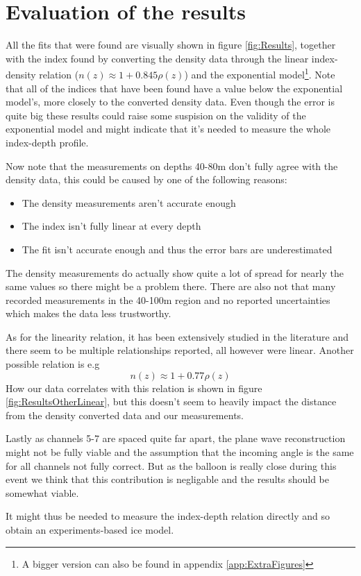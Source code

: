 \section{Evaluation of the results}
All the fits that were found are visually shown in figure \ref{fig:Results},  together
with the index found by converting the density data through the linear index-density relation
($n(z) \approx 1 + 0.845\rho(z)$) and the exponential model\footnote{A bigger version can also be found in appendix \ref{app:ExtraFigures}}.
Note that all of the indices that have been found have a value below the
exponential model's, more closely to the converted density data.
Even though the error is quite big these results could raise some
suspision on the validity of the exponential model and might indicate
that it's needed to measure the whole index-depth profile.

Now note that the measurements on depths 40-80m don't fully agree with the density data, 
this could be caused by one of the following reasons:
\begin{itemize}
	\item The density measurements aren't accurate enough
	\item The index isn't fully linear at every depth
	\item The fit isn't accurate enough and thus the error bars are underestimated
\end{itemize}
The density measurements do actually show quite a lot of spread for
nearly the same values so there might be a problem there. There are
also not that many recorded measurements in the 40-100m region and no reported
uncertainties which makes the data less trustworthy.  

As for the linearity relation, it has been extensively studied in the literature
\cite{KOVACS1995245} and there seem to be multiple relationships reported,
all however were linear. Another possible relation is e.g
\begin{equation}
  n(z) \approx 1 + 0.77\rho(z)
\end{equation}
How our data correlates with this relation is shown in figure
\ref{fig:ResultsOtherLinear}, but this doesn't seem to heavily impact the
distance from the density converted data and our measurements.

Lastly as channels 5-7 are spaced quite far apart, the plane wave reconstruction
might not be fully viable and the assumption that the incoming angle is the same for
all channels not fully correct. But as the balloon is really close during this event
we think that this contribution is negligable and the results should be somewhat viable.

It might thus be needed to measure the index-depth relation directly and so
obtain an experiments-based ice model.
